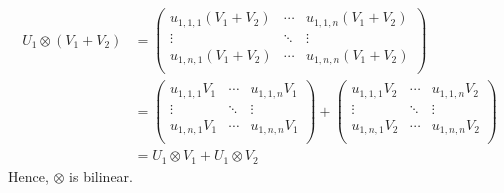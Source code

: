 \documentclass[12pt]{article}
\theoremstyle{definition}
\begin{document}
\begin{enumerate}
\begin{align*}
U_1 \otimes (V_1 + V_2)&=
\begin{pmatrix}
u_{1,1,1}(V_1+V_2) & \cdots & u_{1,1,n}(V_1+V_2) \\
\vdots &  \ddots & \vdots \\
u_{1,n,1}(V_1+V_2) & \cdots & u_{1,n,n}(V_1+V_2) \\
\end{pmatrix}
\\&=
\begin{pmatrix}
u_{1,1,1}V_1 & \cdots & u_{1,1,n}V_1 \\
\vdots &  \ddots & \vdots \\
u_{1,n,1}V_1 & \cdots & u_{1,n,n}V_1 \\
\end{pmatrix}
+
\begin{pmatrix}
u_{1,1,1}V_2 & \cdots & u_{1,1,n}V_2 \\
\vdots &  \ddots & \vdots \\
u_{1,n,1}V_2 & \cdots & u_{1,n,n}V_2 \\
\end{pmatrix}
\\&=U_1 \otimes V_1 +  U_1 \otimes V_2
\end{align*}
Hence, $\otimes$ is bilinear.
\end{enumerate}
\end{document}
